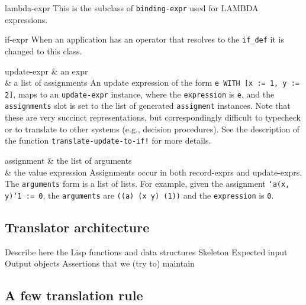 \documentclass[12pt,a4paper,titlepage]{article}
\newcommand{\codeline}[1]{\texttt{#1}}
\begin{document}
\begin{class}{lambda-expr}{}{}{}
This is the subclass of \texttt{binding-expr} used for LAMBDA expressions.
\end{class}

\begin{class}{if-expr}{}{}{}
When an application has an operator that resolves to the \texttt{if\_def} it is changed to this class.
\end{class}

\begin{class}{update-expr}{}{}
{ & an expr \\
  & a list of assignments}
An update expression of the form \texttt{e WITH [x := 1, y := 2]}, maps to
an \texttt{update-expr} instance, where the \texttt{expression} is
\texttt{e}, and the \texttt{assignments} slot is set to the list of
generated \texttt{assigment} instances.  Note that these are very
succinct representations, but correspondingly difficult to typecheck or to
translate to other systems (e.g., decision procedures).  See the
description of the function \codeline{translate-update-to-if!} for more
 details.
\end{class}

\begin{class}{assignment}{}{}
{ & the list of arguments \\
  & the value expression}
Assignments occur in both record-exprs and update-exprs.  The
\texttt{arguments} form is a list of lists.  For example, given the
assignment \texttt{`a(x, y)`1 := 0}, the \texttt{arguments} are
\texttt{((a) (x y) (1))} and the \texttt{expression} is \texttt{0}.
\end{class}



\subsection{Translator architecture}

Describe here the Lisp functions and data structures
Skeleton
Expected input
Output objects
Assertions that we (try to) maintain


\subsection{A few translation rule}
\end{document}
